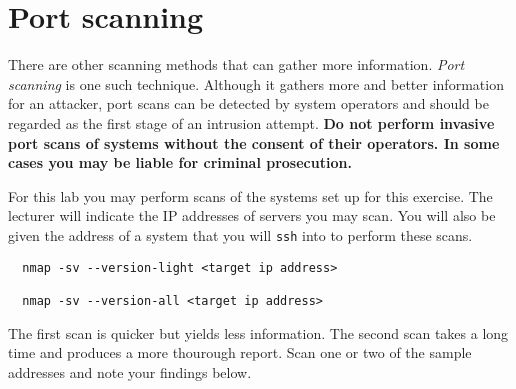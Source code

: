 \documentclass{article}
\begin{document}
\section{Port scanning}
There are other scanning methods that can gather more information.  \emph{Port scanning} is one 
such technique.  Although it gathers more and better information for an attacker, port scans
can be detected by system operators and should be regarded as the first stage of an intrusion 
attempt. \textbf{Do not perform invasive port scans of systems without the consent of their
operators.  In some cases you may be liable for criminal prosecution.}

For this lab you may perform scans of the systems set up for this exercise.  The lecturer will 
indicate the IP addresses of servers you may scan. You will also be given the address of a system that
you will \texttt{ssh} into to perform these scans.

\begin{verbatim}
  nmap -sv --version-light <target ip address>

  nmap -sv --version-all <target ip address>
\end{verbatim}

The first scan is quicker but yields less information.  The second scan takes a long time and produces
a more thourough report. Scan one or two of the sample addresses and note your findings below.
\end{document}
